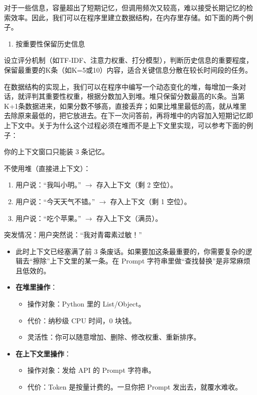 对于一些信息，容量超出了短期记忆，但调用频次又较高，难以接受长期记忆的检索效率。因此，我们可以在程序里建立数据结构，在内存里存储。如下面的两个例子。

\begin{enumerate}
\def\labelenumi{\arabic{enumi}.}
\tightlist
\item
  按重要性保留历史信息
\end{enumerate}

设立评分机制（如TF-IDF、注意力权重、打分模型），判断历史信息的重要程度，保留最重要的K条（如K=5或10）内容，适合关键信息分散在较长时间段的任务。

在数据结构的实现上，我们可以在程序中编写一个动态变化的堆，每增加一条对话，就评判其重要性权重，根据分数加入到堆。堆只保留分数最高的K条。当第K+1条数据进来，如果分数不够高，直接丢弃；如果比堆里最低的高，就从堆里去除原来最低的，把它放进去。在下一次问答前，再将堆中的内容加入短期记忆即上下文中。关于为什么这个过程必须在堆而不是上下文里实现，可以参考下面的例子：

你的上下文窗口只能装 3 条记忆。

不使用堆（直接进上下文）：

\begin{enumerate}
\def\labelenumi{\arabic{enumi}.}
\tightlist
\item
  用户说：``我叫小明。'' \(\to\) 存入上下文（剩 2 空位）。
\item
  用户说：``今天天气不错。'' \(\to\) 存入上下文（剩 1 空位）。
\item
  用户说：``吃个苹果。'' \(\to\) 存入上下文（满员）。
\end{enumerate}

突发情况：用户突然说：``我对青霉素过敏！''

\begin{itemize}
\item
  此时上下文已经塞满了前 3 条废话。如果要加这条最重要的，你需要复杂的逻辑去``擦除''上下文里的某一条。在 Prompt 字符串里做``查找替换''是非常麻烦且低效的。
\item
  \textbf{在堆里操作}：

  \begin{itemize}
  \tightlist
  \item
    操作对象：Python 里的 List/Object。
  \item
    代价：纳秒级 CPU 时间，0 块钱。
  \item
    灵活性：你可以随意增加、删除、修改权重、重新排序。
  \end{itemize}
\item
  \textbf{在上下文里操作}：

  \begin{itemize}
  \tightlist
  \item
    操作对象：发给 API 的 Prompt 字符串。
  \item
    代价：Token 是按量计费的。一旦你把 Prompt 发出去，就覆水难收。
  \end{itemize}
\end{itemize}

